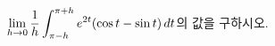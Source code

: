 \hspace*{2mm}\begin{minipage}[t]{\dimexpr\linewidth-2mm\relax}\vspace{0pt}
$\displaystyle\lim_{h\to 0}\dfrac{1}{h}\int_{\pi-h}^{\pi+h}e^{2t}(\cos t-\sin t)\mkern3mu dt$의 값을 구하시오.\end{minipage}
